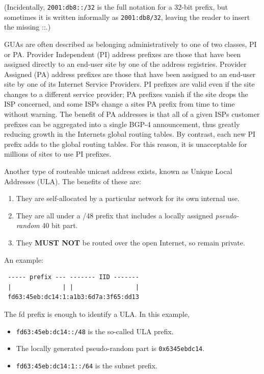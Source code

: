 \documentclass[
]{article}
\providecommand{\tightlist}{%
  \setlength{\itemsep}{0pt}\setlength{\parskip}{0pt}}
\begin{document}
(Incidentally, \texttt{2001:db8::/32} is the full notation for a 32-bit
prefix, but sometimes it is written informally as \texttt{2001:db8/32},
leaving the reader to insert the missing
\textquotesingle::\textquotesingle.)

GUAs are often described as belonging administratively to one of two
classes, PI or PA. Provider Independent (PI) address prefixes are those
that have been assigned directly to an end-user site by one of the
address registries. Provider Assigned (PA) address prefixes are those
that have been assigned to an end-user site by one of its Internet
Service Providers. PI prefixes are valid even if the site changes to a
different service provider; PA prefixes vanish if the site drops the ISP
concerned, and some ISPs change a site\textquotesingle s PA prefix from
time to time without warning. The benefit of PA addresses is that all of
a given ISP\textquotesingle s customer prefixes can be aggregated into a
single BGP-4 announcement, thus greatly reducing growth in the
Internet\textquotesingle s global routing tables. By contrast, each new
PI prefix adds to the global routing tables. For this reason, it is
unacceptable for millions of sites to use PI prefixes.

Another type of routeable unicast address exists, known as Unique Local
Addresses (ULA). The benefits of these are:

\begin{enumerate}
\def\labelenumi{\arabic{enumi}.}
\tightlist
\item
  They are self-allocated by a particular network for its own internal
  use.
\item
  They are all under a /48 prefix that includes a locally assigned
  \emph{pseudo-random} 40 bit part.
\item
  They \textbf{MUST NOT} be routed over the open Internet, so remain
  private.
\end{enumerate}

An example:

\begin{verbatim}
 ----- prefix --- ------- IID -------
 |              | |                 |
 fd63:45eb:dc14:1:a1b3:6d7a:3f65:dd13
\end{verbatim}

The \textquotesingle fd\textquotesingle{} prefix is enough to identify a
ULA. In this example,

\begin{itemize}
\tightlist
\item
  \texttt{fd63:45eb:dc14::/48} is the so-called ULA prefix.
\item
  The locally generated pseudo-random part is \texttt{0x6345ebdc14}.
\item
  \texttt{fd63:45eb:dc14:1::/64} is the subnet prefix.
\end{itemize}
\end{document}
